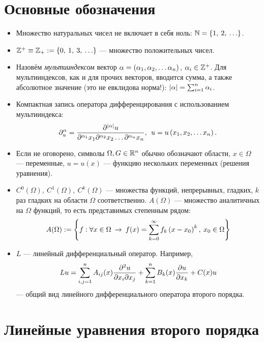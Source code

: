 \newpage
\section{Основные обозначения}
\begin{itemize}
    \item Множество натуральных чисел не включает в себя ноль: $ \mathbb{N} = \left\{{1,\:2,\:\ldots}\right\} $.
    \item $\mathbb{Z}^+ \equiv \mathbb{Z}_+ := \left\{{0,\:1,\:3,\:\ldots}\right\}$ --- множество положительных чисел.
    \item Назовём \textit{мультииндексом} вектор $\alpha = \left({\alpha_1,\alpha_2, \ldots\alpha_n}\right),\: \alpha_i \in \mathbb{Z}^+ $.
          Для мультииндексов, как и для прочих векторов, вводится сумма, а также абсолютное значение (это не евклидова норма!):
          $\left|{\alpha}\right| = \sum_{i = 1}^n \alpha_i$.
    \item Компактная запись оператора дифференцирования с использованием мультииндекса:
          \[
              \partial^{\alpha}_u = \frac{\partial^{\left|{\alpha}\right|}u}
              {\partial^{\alpha_1}x_1 \partial^{\alpha_2}x_2 \ldots \partial^{\alpha_n}x_n},\:\:
              u = u\left({x_1, x_2, \dots x_n}\right).
          \]
    \item Если не оговорено, символы $\Omega, G \in \mathbb{R}^n$ обычно обозначают области, $x \in \Omega$ --- переменные,
          $u = u(x)$ --- функцию нескольких переменных (решения уравнения).
    \item $C^0(\Omega),\: C^1(\Omega),\: C^k(\Omega)$\: --- множества функций, непрерывных, гладких, $k$ раз гладких на
          области $\Omega$ соответственно. $A(\Omega)$ --- множество аналитичных на $\Omega$ функций, то есть представимых
          степенным рядом:
          \[
              A(\Omega) := \left\{{f : \forall x \in \Omega \: \rightarrow \: f(x) = \sum_{k = 0}^{\infty} f_k \left({x - x_0}\right)^k,\: x_0 \in \Omega}\right\}
          \]
    \item $L$ --- линейный дифференциальный оператор. Например,
          \[
              Lu = \sum_{i,j = 1}^n A_{ij}(x) \frac{\partial^2u}{\partial x_i\partial x_j} + \sum_{k = 1}^n B_k(x)\frac{\partial u}{\partial x_k} + C(x)u
          \]
          --- общий вид линейного дифференциального оператора второго порядка.
\end{itemize}

\newpage
\section{Линейные уравнения второго порядка}

